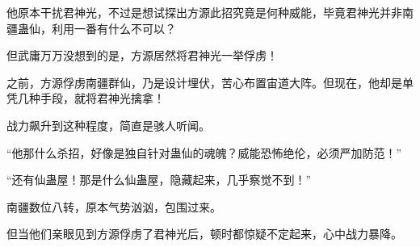 \begin{this_body}
他原本干扰君神光，不过是想试探出方源此招究竟是何种威能，毕竟君神光并非南疆蛊仙，利用一番有什么不可以？

但武庸万万没想到的是，方源居然将君神光一举俘虏！

之前，方源俘虏南疆群仙，乃是设计埋伏，苦心布置宙道大阵。但现在，他却是单凭几种手段，就将君神光擒拿！

战力飙升到这种程度，简直是骇人听闻。

“他那什么杀招，好像是独自针对蛊仙的魂魄？威能恐怖绝伦，必须严加防范！”

“还有仙蛊屋！那是什么仙蛊屋，隐藏起来，几乎察觉不到！”

南疆数位八转，原本气势汹汹，包围过来。

但当他们亲眼见到方源俘虏了君神光后，顿时都惊疑不定起来，心中战力暴降。

\end{this_body}

